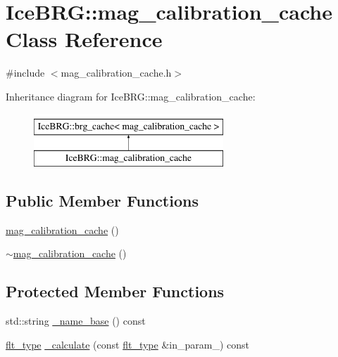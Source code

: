 \hypertarget{classIceBRG_1_1mag__calibration__cache}{\section{Ice\-B\-R\-G\-:\-:mag\-\_\-calibration\-\_\-cache Class Reference}
\label{classIceBRG_1_1mag__calibration__cache}
}


{\ttfamily \#include $<$mag\-\_\-calibration\-\_\-cache.\-h$>$}

Inheritance diagram for Ice\-B\-R\-G\-:\-:mag\-\_\-calibration\-\_\-cache\-:\begin{figure}[H]
\begin{center}
\leavevmode
\includegraphics[height=2.000000cm]{classIceBRG_1_1mag__calibration__cache}
\end{center}
\end{figure}
\subsection*{Public Member Functions}
\begin{DoxyCompactItemize}
\item 
\hyperlink{classIceBRG_1_1mag__calibration__cache_a99d33bd36e6243810e1a5bc6dc262c08}{mag\-\_\-calibration\-\_\-cache} ()
\item 
\hyperlink{classIceBRG_1_1mag__calibration__cache_ad666da3efdda13aa3951e1cf54b5a17c}{$\sim$mag\-\_\-calibration\-\_\-cache} ()
\end{DoxyCompactItemize}
\subsection*{Protected Member Functions}
\begin{DoxyCompactItemize}
\item 
std\-::string \hyperlink{classIceBRG_1_1mag__calibration__cache_acd287d8811a0d0dfe63b39a7025bf065}{\-\_\-name\-\_\-base} () const 
\item 
\hyperlink{lib_2IceBRG__main_2common_8h_ad0f130a56eeb944d9ef2692ee881ecc4}{flt\-\_\-type} \hyperlink{classIceBRG_1_1mag__calibration__cache_a0ea0cf2413d6046542b5211f13bb9922}{\-\_\-calculate} (const \hyperlink{lib_2IceBRG__main_2common_8h_ad0f130a56eeb944d9ef2692ee881ecc4}{flt\-\_\-type} \&in\-\_\-param\-\_) const 
\end{DoxyCompactItemize}
